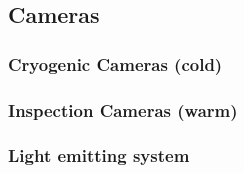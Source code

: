 \subsection{Cameras}
\label{sec:fdsp-slow-cryo-cameras}


\subsubsection{Cryogenic Cameras (cold)}

\subsubsection{Inspection Cameras (warm)}

\subsubsection{Light emitting system}
